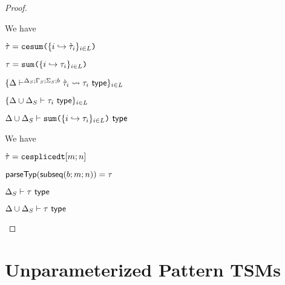 \begin{proof}
\begin{byCases}
\item[\text{(\ref{rule:cvalidT-U-sum})}] We have
\begin{pfsteps*}
\item $\grave{\tau}=\texttt{cesum}\texttt{(}\{i \hookrightarrow \grave{\tau}_{i}\}_{i \in L}\texttt{)}$   
\item $\tau=\texttt{sum}\texttt{(}\{i \hookrightarrow \tau_{i}\}_{i \in L}\texttt{)}$ 
\item $\{\Delta\vdash^{\Delta_S; \Gamma_S; \Sigma_S; b} \grave{\tau}_i \leadsto \tau_i~\mathsf{type}\}_{i \in L}$  
\item $\{\Delta \cup \Delta_S \vdash \tau_i~\mathsf{type}\}_{i \in L}$  
\item $\Delta \cup \Delta_S \vdash \texttt{sum}\texttt{(}\{i \hookrightarrow \tau_{i}\}_{i \in L}\texttt{)}~\mathsf{type}$ 
\end{pfsteps*}
\resetpfcounter

\item[\text{(\ref{rule:cvalidT-U-splicedt})}] We have
\begin{pfsteps*}
\item $\grave{\tau}=\texttt{cesplicedt}[m; n]$ 
\item $\mathsf{parseTyp}(\mathsf{subseq}(b; m; n))=\tau$ 
\item $\Delta_S \vdash \tau~\mathsf{type}$ 
\item $\Delta \cup \Delta_S \vdash \tau~\mathsf{type}$ 
\end{pfsteps*}
\end{byCases}
\end{proof}
\chapter{Unparameterized Pattern TSMs}\label{sec:pattern-tsms}

